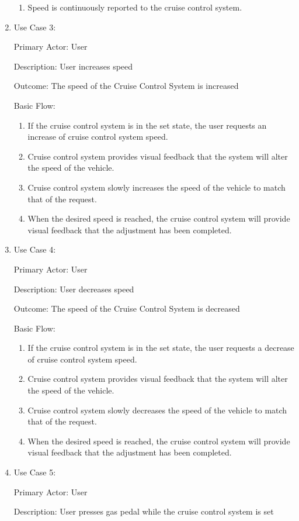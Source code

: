 \documentclass[preprint,11pt,3p]{article}
\begin{document}
\begin{enumerate}
\begin{enumerate}
			\item Speed is continuously reported to the cruise control system.
		\end{enumerate}
	\item 	Use Case 3: \par
			Primary Actor: User \par
			Description: User increases speed\par
			Outcome: The speed of the Cruise Control System is increased\par
			Basic Flow:
		\begin{enumerate}
			\item If the cruise control system is in the set state, the user requests an increase of cruise control system speed.
			\item Cruise control system provides visual feedback that the system will alter the speed of the vehicle.
			\item Cruise control system slowly increases the speed of the vehicle to match that of the request.
			\item When the desired speed is reached, the cruise control system will provide visual feedback that the adjustment has been completed.
		\end{enumerate}
	\item 	Use Case 4: \par
			Primary Actor: User \par
			Description: User decreases speed\par
			Outcome: The speed of the Cruise Control System is decreased\par
			Basic Flow:
		\begin{enumerate}
			\item If the cruise control system is in the set state, the user requests a decrease of cruise control system speed.
			\item Cruise control system provides visual feedback that the system will alter the speed of the vehicle.
			\item Cruise control system slowly decreases the speed of the vehicle to match that of the request.
			\item When the desired speed is reached, the cruise control system will provide visual feedback that the adjustment has been completed.
		\end{enumerate}
	\item 	Use Case 5: \par
			Primary Actor: User \par
			Description: User presses gas pedal while the cruise control system is set\par

\end{enumerate}
\end{document}
